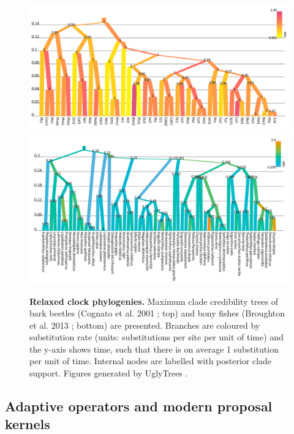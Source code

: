 \documentclass[10pt,letterpaper]{article}
\begin{document}
\begin{figure}[!h]
\includegraphics[width=\textwidth]{Figures/cognato.pdf}
\includegraphics[width=\textwidth]{Figures/broughton.pdf}
\caption{\textbf{Relaxed clock phylogenies.} 
Maximum clade credibility trees of bark beetles (Cognato et al. 2001 \cite{Cognato_2001}; top) and bony fishes (Broughton et al. 2013 \cite{Broughton_2013}; bottom) are presented. 
Branches are coloured by substitution rate (units: substitutions per site per unit of time) and the y-axis shows time, such that there is on average 1 substitution per unit of time.
 Internal nodes are labelled with posterior clade support. Figures generated by UglyTrees \cite{uglytrees}.  }
\label{fig:parameterisationResults}
\end{figure}





\subsection*{Adaptive operators and modern proposal kernels}
	
\end{document}
